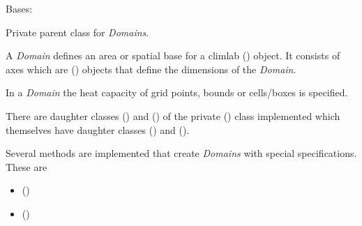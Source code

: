 \documentclass[a4paper,10pt,english]{sphinxmanual}
\begin{document}

\begin{fulllineitems}
\label{api/climlab.domain:climlab.domain.domain._Domain}
Bases: \href{http://docs.python.org/2.7/library/functions.html\#object}{}

Private parent class for \emph{Domains}.

A \emph{Domain} defines an area or spatial base for a climlab 
{\hyperref[api/climlab.process:climlab.process.process.Process]{\emph{}}} () object. It consists of axes which
are {\hyperref[api/climlab.domain:climlab.domain.axis.Axis]{\emph{}}} () objects that define the dimensions 
of the \emph{Domain}.

In a \emph{Domain} the heat capacity of grid points, bounds or cells/boxes is 
specified.

There are daughter classes {\hyperref[api/climlab.domain:climlab.domain.domain.Atmosphere]{\emph{}}} () and
{\hyperref[api/climlab.domain:climlab.domain.domain.Ocean]{\emph{}}} () of the private 
{\hyperref[api/climlab.domain:climlab.domain.domain._Domain]{\emph{}}} () class implemented which themselves 
have daughter classes {\hyperref[api/climlab.domain:climlab.domain.domain.SlabAtmosphere]{\emph{}}} () and 
{\hyperref[api/climlab.domain:climlab.domain.domain.SlabOcean]{\emph{}}} ().

Several methods are implemented that create \emph{Domains} with special 
specifications. These are
\begin{itemize}
\item {} 
{\hyperref[api/climlab.domain:climlab.domain.domain.single_column]{\emph{}}} ()

\item {} 
{\hyperref[api/climlab.domain:climlab.domain.domain.zonal_mean_column]{\emph{}}} ()


\end{itemize}
\end{fulllineitems}
\end{document}
